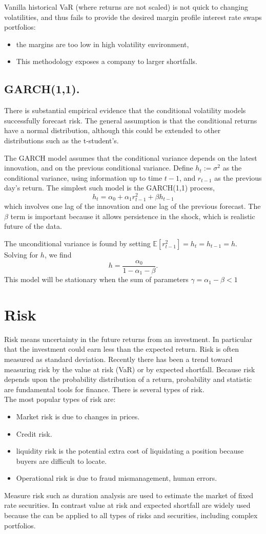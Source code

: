 \documentclass{book}
\begin{document}
Vanilla historical VaR (where returns are not scaled) is not quick to changing volatilities, and thus fails to provide the desired margin profile interest rate swaps portfolios:
\begin{itemize}
\item the margins are too low in high volatility environment,
\item This methodology exposes a company to larger shortfalls.
\end{itemize}
\subsection{GARCH(1,1).}
There is substantial empirical evidence that the conditional volatility models successfully forecast risk. The general assumption is that the conditional returns have a normal distribution, although this could be extended to other distributions such as the t-student's.

The GARCH model assumes that the conditional variance depends on the latest innovation, and on the previous conditional variance. Define $h_{t}:=\sigma^{2}$ as the conditional variance, using information up to time $t-1$, and $r_{t-1}$ as the previous day's return. The simplest such model is the GARCH(1,1) process,
$$
h_{t}=\alpha_{0}+\alpha_{1}r_{t-1}^{2}+\beta h_{t-1}
$$
which involves one lag of the innovation and one lag of the previous forecast. The $\beta$ term is important because it allows persistence in the shock, which is realistic future of the data.

The unconditional variance is found by setting $\mathbb{E}[r_{t-1}^{2}]=h_{t}=h_{t-1}=h.$ Solving for $h$, we find
$$
h=\frac{\alpha_{0}}{1-\alpha_{1}-\beta}.
$$
This model will be stationary when the sum of parameters $\gamma=\alpha_{1}-\beta<1$
\section{Risk}
Risk means uncertainty in the future returns from an investment. In particular that the investment could earn less than the expected return. Risk is often measured as standard deviation. Recently there has been a trend toward measuring risk by the value at risk (VaR) or by expected shortfall.  Because risk depends upon the probability distribution of a return, probability and statistic are fundamental tools for finance. There is several types of risk.\\ 
The most popular types of risk are:
\begin{itemize}
\item Market risk is due to changes in prices. 
\item Credit risk.
\item liquidity risk is the potential extra cost of liquidating a position because buyers are difficult to locate.
\item Operational risk is due to fraud mismanagement, human errors.
\end{itemize}
Measure risk such as duration analysis are used to estimate the market of fixed rate securities. In contrast value at risk and expected shortfall are widely used because the can be applied to all types of risks and securities, including complex portfolios.\\
\end{document}
